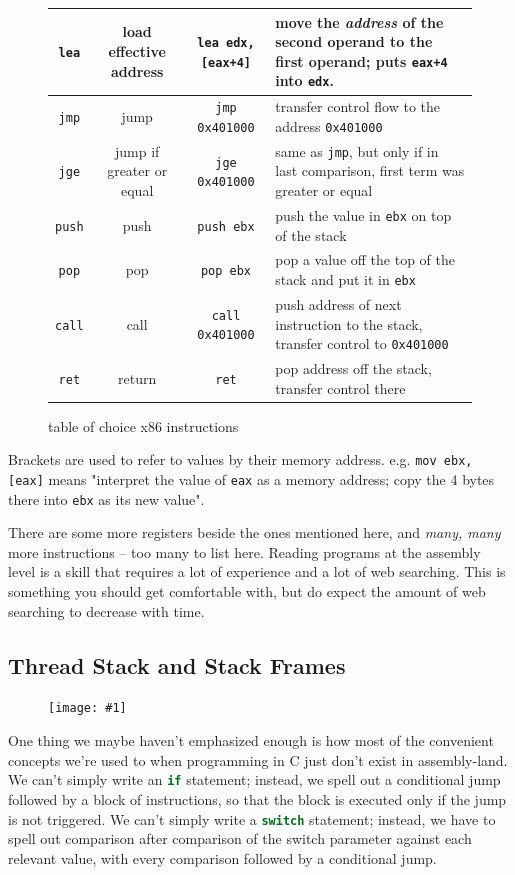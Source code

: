 \documentclass{article}
\newcommand{\wrapimageright}[1] {
    \begin{figure}
        \begin{center}
            \texttt{[image: \#1]} 
        \end{center}
    \end{figure}
}
\newcommand{\xcode}[2]{\colorbox{ubuntuback}{\lstinline[language=#1]|#2|}}
\newcommand{\asm}[1]{\xcode{{[x86masm]assembler}}{#1}}
\newcommand{\code}[1]{\colorbox{ubuntuback}{\texttt{#1}}}
\begin{document}
\begin{figure}[H]
\begin{tabular}{|c|c|c|p{}|}
        \asm{lea} & load effective address & \asm{lea edx, [eax+4]} & move the \textit{address} of the second operand to the first operand; puts \asm{eax+4} into \asm{edx}.  \\
    \hline 

    \asm{jmp} & jump & \asm{jmp 0x401000} & transfer control flow to the address \code{0x401000} \\
    \hline 

    \asm{jge} & jump if greater or equal & \asm{jge 0x401000} & same as \asm{jmp}, but only if in last comparison, first term was greater or equal \\
    \hline 
  
    \asm{push} & push & \asm{push ebx} & push the value in \asm{ebx} on top of the stack \\
    \hline 

    \asm{pop}& pop & \asm{pop ebx} & pop a value off the top of the stack and put it in \asm{ebx} \\
    \hline 

    \asm{call} & call & \asm{call 0x401000} & push address of next instruction to the stack, transfer control to \code{0x401000} \\
    \hline 

    \asm{ret} & return & \asm{ret} & pop address off the stack, transfer control there \\
    \hline 
\end{tabular}
    \caption{table of choice x86 instructions}
\end{figure}

Brackets are used to refer to values by their memory address. e.g. \asm{mov ebx, [eax]} means "interpret the value of \asm{eax} as a memory address; copy the 4 bytes there into \asm{ebx} as its new value".   

There are some more registers beside the ones mentioned here, and \textit{many, many} more instructions -- too many to list here. Reading programs at the assembly level is a skill that requires a lot of experience and a lot of web searching. This is something you should get comfortable with, but do expect the amount of web searching to decrease with time.

\subsection{Thread Stack and Stack Frames}

\wrapimageright{./images/if_statement_assembly.png}
One thing we maybe haven't emphasized enough is how most of the convenient concepts we're used to when programming in C just don't exist in assembly-land. We can't simply write an \xcode{C}{if} statement; instead, we spell out a conditional jump followed by a block of instructions, so that the block is executed only if the jump is not triggered. We can't simply write a \xcode{C}{switch} statement; instead, we have to spell out comparison after comparison of the switch parameter against each relevant value, with every comparison followed by a conditional jump.
\end{document}
